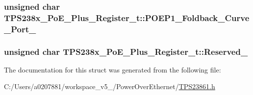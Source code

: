 \hypertarget{struct_t_p_s238x___po_e___plus___register__t_a9b6645b3f46d9612adb4a1b733c408cf}{
\subsubsection[{P\-O\-E\-P1\-\_\-\-Foldback\-\_\-\-Curve\-\_\-\-Port\-\_\-4}]{\setlength{\rightskip}{0pt plus 5cm}unsigned char T\-P\-S238x\-\_\-\-Po\-E\-\_\-\-Plus\-\_\-\-Register\-\_\-t\-::\-P\-O\-E\-P1\-\_\-\-Foldback\-\_\-\-Curve\-\_\-\-Port\-\_}}\label{struct_t_p_s238x___po_e___plus___register__t_a9b6645b3f46d9612adb4a1b733c408cf}
\hypertarget{struct_t_p_s238x___po_e___plus___register__t_a06baf9fa5616267c8ade0ced4a4ff40e}{
\subsubsection[{Reserved\-\_\-18}]{\setlength{\rightskip}{0pt plus 5cm}unsigned char T\-P\-S238x\-\_\-\-Po\-E\-\_\-\-Plus\-\_\-\-Register\-\_\-t\-::\-Reserved\-\_}}\label{struct_t_p_s238x___po_e___plus___register__t_a06baf9fa5616267c8ade0ced4a4ff40e}


The documentation for this struct was generated from the following file\-:\begin{DoxyCompactItemize}
\item 
C\-:/\-Users/a0207881/workspace\-\_\-v5\-\_/\-Power\-Over\-Ethernet/\hyperlink{_t_p_s23861_8h}{T\-P\-S23861.\-h}\end{DoxyCompactItemize}
